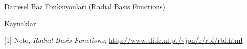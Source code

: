 \documentclass[12pt,fleqn]{article}\usepackage{../../common}
\begin{document}
Dairesel Baz Fonksiyonlari (Radial Basis Functions)






















Kaynaklar

[1] Neto, {\em Radial Basis Functions}, \url{http://www.di.fc.ul.pt/~jpn/r/rbf/rbf.html}
\end{document}

